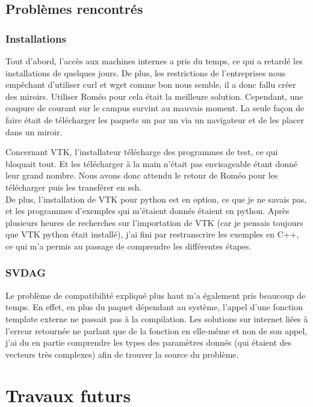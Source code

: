 \documentclass[12pt,a4paper,twoside]{article}
\begin{document}
    \newpage
    \subsection{Problèmes rencontrés}

    \subsubsection{Installations}

    Tout d'abord, l'accès aux machines internes a pris du temps, ce qui a retardé les installations de quelques jours.
    De plus, les restrictions de l'entreprises nous empêchant d'utiliser curl et wget comme bon nous semble, il a donc fallu créer des miroirs.
    Utiliser Roméo pour cela était la meilleure solution. Cependant, une coupure de courant sur le campus survint au mauvais moment.
    La seule façon de faire était de télécharger les paquets un par un via un navigateur et de les placer dans un miroir.

    Concernant VTK, l'installateur télécharge des programmes de test, ce qui bloquait tout. Et les télécharger à la main n'était
    pas envisageable étant donné leur grand nombre. Nous avons donc attendu le retour de Roméo pour les télécharger puis les transférer en ssh.
    \\De plus, l'installation de VTK pour python est en option, ce que je ne savais pas, et les programmes d'exemples qui m'étaient
    donnés étaient en python. Après plusieurs heures de recherches sur l'importation de VTK (car je pensais toujours que VTK python était installé),
    j'ai fini par restranscrire les exemples en C++, ce qui m'a permis au passage de comprendre les différentes étapes.

    \subsubsection{SVDAG}

    Le problème de compatibilité expliqué plus haut m'a également pris beaucoup de temps. En effet, en plus du paquet dépendant au système,
    l'appel d'une fonction template externe ne passait pas à la compilation. Les solutions sur internet liées à l'erreur
    retournée ne parlant que de la fonction en elle-même et non de son appel, j'ai du en partie comprendre les types des
    paramètres donnés (qui étaient des vecteurs très complexes) afin de trouver la source du problème.

    \newpage
    \section{Travaux futurs}
\end{document}
